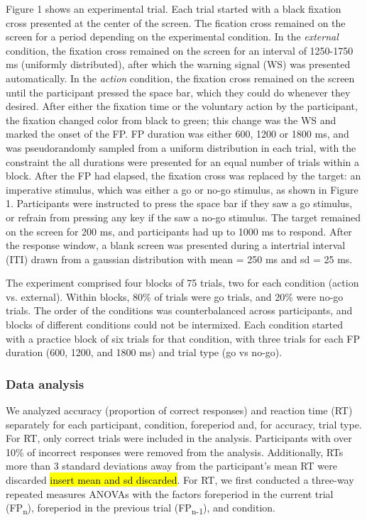 \documentclass{article}
\begin{document}
Figure 1 shows an experimental trial. Each trial started with a black fixation cross presented at the center of the screen. The fication cross remained on the screen for a period depending on the experimental condition. In the \textit{external} condition, the fixation cross remained on the screen for an interval of 1250-1750 ms (uniformly distributed), after which the warning signal (WS) was presented automatically. In the \textit{action} condition, the fixation cross remained on the screen until the participant pressed the space bar, which they could do whenever they desired. After either the fixation time or the voluntary action by the participant, the fixation changed color from black to green; this change was the WS and marked the onset of the FP. FP duration was either 600, 1200 or 1800 ms, and was pseudorandomly sampled from a uniform distribution in each trial, with the constraint the all durations were presented for an equal number of trials within a block. After the FP had elapsed, the fixation cross was replaced by the target: an imperative stimulus, which was either a go or no-go stimulus, as shown in Figure 1. Participants were instructed to press the space bar if they saw a go stimulus, or refrain from pressing any key if the saw a no-go stimulus. The target remained on the screen for 200 ms, and participants had up to 1000 ms to respond. After the response window, a blank screen was presented during a intertrial interval (ITI) drawn from a gaussian distribution with mean = 250 ms and sd = 25 ms. %


The experiment comprised four blocks of 75 trials, two for each condition (action vs. external). Within blocks, 80\% of trials were go trials, and 20\% were no-go trials. The order of the conditions was counterbalanced across participants, and blocks of different conditions could not be intermixed. Each condition started with a practice block of six trials for that condition, with three trials for each FP duration (600, 1200, and 1800 ms) and trial type (go vs no-go).


\subsubsection{Data analysis}
We analyzed accuracy (proportion of correct responses) and reaction time (RT) separately for each participant, condition, foreperiod and, for accuracy, trial type. For RT, only correct trials were included in the analysis. Participants with over 10\% of incorrect responses were removed from the analysis. Additionally, RTs more than 3 standard deviations away from the participant's mean RT were discarded \hl{insert mean and sd discarded}.
For RT, we first conducted a three-way repeated measures ANOVAs with the factors foreperiod in the current trial (FP\textsubscript{n}), foreperiod in the previous trial (FP\textsubscript{n-1}), and condition.
\end{document}
